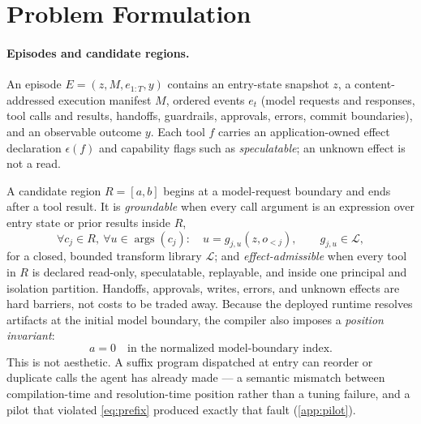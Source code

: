 \section{Problem Formulation}
\label{sec:problem}

\paragraph{Episodes and candidate regions.}
An episode $E=(z,M,e_{1:T},y)$ contains an entry-state snapshot $z$, a
content-addressed execution manifest $M$, ordered events $e_t$ (model requests
and responses, tool calls and results, handoffs, guardrails, approvals, errors,
commit boundaries), and an observable outcome $y$. Each tool $f$ carries an
application-owned effect declaration $\epsilon(f)$ and capability flags such as
\emph{speculatable}; an unknown effect is not a read.

A candidate region $R=[a,b]$ begins at a model-request boundary and ends after
a tool result. It is \emph{groundable} when every call argument is an
expression over entry state or prior results inside $R$,
\begin{equation}
  \forall c_j \in R,\ \forall u \in \operatorname{args}(c_j):\quad
  u = g_{j,u}\!\left(z, o_{<j}\right),\qquad g_{j,u}\in\mathcal{L},
  \label{eq:grounding}
\end{equation}
for a closed, bounded transform library $\mathcal{L}$; and
\emph{effect-admissible} when every tool in $R$ is declared read-only,
speculatable, replayable, and inside one principal and isolation partition.
Handoffs, approvals, writes, errors, and unknown effects are hard barriers, not
costs to be traded away. Because the deployed runtime resolves artifacts at the
initial model boundary, the compiler also imposes a \emph{position invariant}:
\begin{equation}
  a = 0 \quad\text{in the normalized model-boundary index.}
  \label{eq:prefix}
\end{equation}
This is not aesthetic. A suffix program dispatched at entry can reorder or
duplicate calls the agent has already made --- a semantic mismatch between
compilation-time and resolution-time position rather than a tuning failure, and
a pilot that violated \cref{eq:prefix} produced exactly that fault
(\cref{app:pilot}).

